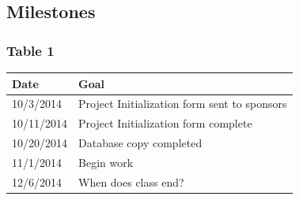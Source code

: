 \documentclass[12pt]{article}
\begin{document}
\begin{spacing}{1.5}
\subsection{Milestones}
\subsubsection{Table 1}
\begin{tabular}{l | l}
Date			&	Goal \\
\hline
10/3/2014		&	Project Initialization form sent to sponsors \\
\hline
10/11/2014		&	Project Initialization form complete \\
\hline
10/20/2014		&	Database copy completed \\
\hline
11/1/2014		&	Begin work \\
\hline
12/6/2014		&	When does class end? \\
\end{tabular}

\end{spacing}
\end{document}
